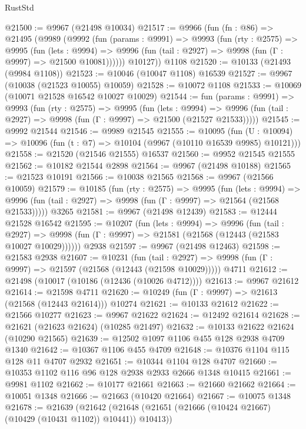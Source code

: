 \begin{lexlean}{RustStd}
\begin{coremodule}
@21500 := @9967 (@21498 @10034)
@21517 := @9966
    (fun (fn : @86) =>
    @21495
      (@9989
        (@9992
          (fun (params : @9991) =>
          @9993
            (fun (rty : @2575) =>
            @9995
              (fun (lets : @9994) =>
              @9996 (fun (tail : @2927) => @9998 (fun (Γ : @9997) => @21500 @10081))))))
        @10127))
    @1108
@21520 := @10133 (@21493 (@9984 @1108))
@21523 := @10046 (@10047 @1108) @16539
@21527 := @9967 (@10038 (@21523 @10055) @10059)
@21528 := @10072 @1108
@21533 := @10069 (@10071 @21528 @16542 @10027 @10029)
@21544 := fun (params : @9991) =>
  @9993
    (fun (rty : @2575) =>
    @9995
      (fun (lets : @9994) =>
      @9996 (fun (tail : @2927) => @9998 (fun (Γ : @9997) => @21500 (@21527 @21533)))))
@21545 := @9992 @21544
@21546 := @9989 @21545
@21555 := @10095
    (fun (U : @10094) => @10096 (fun (t : @7) => @10104 (@9967 (@10110 @16539 @9985) @10121)))
@21558 := @21520 (@21546 @21555) @16537
@21560 := @9952 @21545 @21555
@21562 := @10182 @21544 @2898
@21564 := @9967 (@21498 @10188)
@21565 := @21523 @10191
@21566 := @10038 @21565
@21568 := @9967 (@21566 @10059)
@21579 := @10185
    (fun (rty : @2575) =>
    @9995
      (fun (lets : @9994) =>
      @9996 (fun (tail : @2927) => @9998 (fun (Γ : @9997) => @21564 (@21568 @21533)))))
    @3265
@21581 := @9967 (@21498 @12439)
@21583 := @12444 @21528 @16542
@21595 := @10207
    (fun (lets : @9994) =>
    @9996
      (fun (tail : @2927) =>
      @9998 (fun (Γ : @9997) => @21581 (@21568 (@12443 (@21583 @10027 @10029))))))
    @2938
@21597 := @9967 (@21498 @12463)
@21598 := @21583 @2938
@21607 := @10231
    (fun (tail : @2927) => @9998 (fun (Γ : @9997) => @21597 (@21568 (@12443 (@21598 @10029)))))
    @4711
@21612 := @21498 (@10017 (@10186 (@12436 (@10026 @4712))))
@21613 := @9967 @21612
@21614 := @21598 @4711
@21620 := @10249 (fun (Γ : @9997) => @21613 (@21568 (@12443 @21614))) @10274
@21621 := @10133 @21612
@21622 := @21566 @10277
@21623 := @9967 @21622
@21624 := @12492 @21614
@21628 := @21621 (@21623 @21624) (@10285 @21497)
@21632 := @10133 @21622 @21624 (@10290 @21565)
@21639 := @12502 @1097 @1106 @455 @128 @2938 @4709 @1340
@21642 := @10367 @1106 @455 @4709
@21648 := @10376 @1104 @115 @128 @11 @4707 @2932
@21651 := @10344 @1104 @128 @4707
@21660 := @10353 @1102 @116 @96 @128 @2938 @2933 @2666 @1348 @10415
@21661 := @9981 @1102
@21662 := @10177 @21661
@21663 := @21660 @21662
@21664 := @10051 @1348
@21666 := @21663 (@10420 @21664)
@21667 := @10075 @1348
@21678 := @21639
    (@21642 (@21648 (@21651 (@21666 (@10424 @21667) (@10429 (@10431 @1102)) @10441)) @10413))

\end{coremodule}
\end{lexlean}
